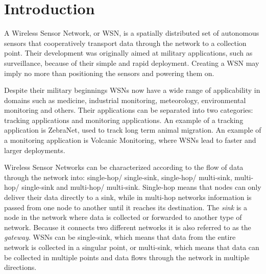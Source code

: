 
\chapter{Introduction}

A Wireless Sensor Network, or WSN, is a spatially distributed set of autonomous
sensors that cooperatively transport data through the network to a collection
point. Their development was originally aimed at military applications, such as
surveillance, because of their simple and rapid deployment. Creating a WSN may
imply no more than positioning the sensors and powering them on.

Despite their military beginnings WSNs now have a wide range of applicability
in domains such as medicine, industrial monitoring, meteorology, environmental
monitoring and others. Their applications can be separated into two categories:
tracking applications and monitoring applications. An example of a tracking
application is ZebraNet\cite{zhang2004hardware}, used to track long term animal
migration. An example of a monitoring application is Volcanic
Monitoring\cite{werner2006deploying}, where WSNs lead to faster and larger
deployments.

Wireless Sensor Networks can be characterized according to the flow of data
through the network into: single-hop/ single-sink, single-hop/ multi-sink,
multi-hop/ single-sink and multi-hop/ multi-sink. Single-hop means that nodes
can only deliver their data directly to a sink, while in multi-hop networks
information is passed from one node to another until it reaches its
destination. The \emph{sink} is a node in the network where data is collected
or forwarded to another type of network. Because it connects two different
networks it is also referred to as the \emph{gateway}. WSNs can be single-sink,
which means that data from the entire network is collected in a singular point,
or multi-sink, which means that data can be collected in multiple points and
data flows through the network in multiple directions.

